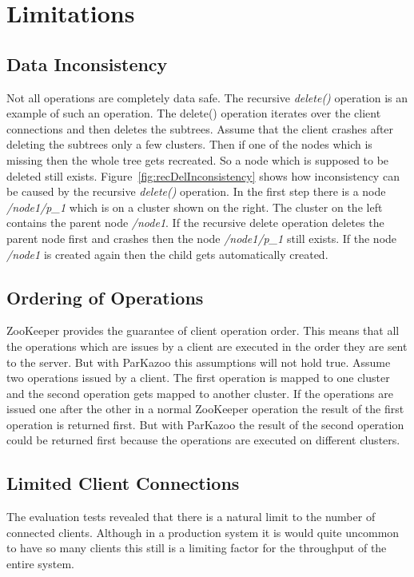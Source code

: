 \chapter{Limitations}

\section{Data Inconsistency}



Not all operations are completely data safe. The recursive \textit{delete()} operation is an example of such an operation. The delete() operation iterates over the client connections and then deletes the subtrees. Assume that the client crashes after deleting the subtrees only a few clusters. Then if one of the nodes which is missing then the whole tree gets recreated. So a node which is supposed to be deleted still exists. Figure~\ref{fig:recDelInconsistency} shows how inconsistency can be caused by the recursive \textit{delete()} operation. In the first step there is a node \textit{/node1/p\_1} which is on a cluster shown on the right. The cluster on the left contains the parent node \textit{/node1}. If the recursive delete operation deletes the parent node first and crashes then the node \textit{/node1/p\_1} still exists. If the node \textit{/node1} is created again then the child gets automatically created.

\section{Ordering of Operations}
ZooKeeper provides the guarantee of client operation order. This means that all the operations which are issues by a client are executed in the order they are sent to the server. But with ParKazoo this assumptions will not hold true. Assume two operations issued by a client. The first operation is mapped to one cluster and the second operation gets mapped to another cluster. If the operations are issued one after the other in a normal ZooKeeper operation the result of the first operation is returned first. But with ParKazoo the result of the second operation could be returned first because the operations are executed on different clusters.

\section{Limited Client Connections}
The evaluation tests revealed that there is a natural limit to the number of connected clients. Although in a production system it is would quite uncommon to have so many clients this still is a limiting factor for the throughput of the entire system.
